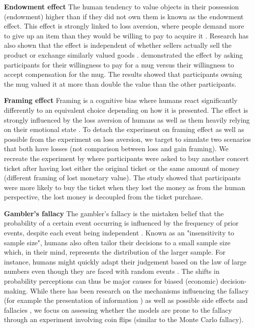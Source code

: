 \par \textbf{Endowment effect} The human tendency to value objects in their possession (endowment) higher than if they did not own them is known as the endowment effect. This effect is strongly linked to loss aversion, where people demand more to give up an item than they would be willing to pay to acquire it \parencite{kahneman1990experimental}. Research has also shown that the effect is independent of whether sellers actually sell the product or exchange similarly valued goods \parencite{knetsch1989endowment}. \textcite{kahneman1990experimental} demonstrated the effect by asking participants for their willingness to pay for a mug versus their willingness to accept compensation for the mug. The results showed that participants owning the mug valued it at more than double the value than the other participants.

\par \textbf{Framing effect} Framing is a cognitive bias where humans react significantly differently to an equivalent choice depending on how it is presented. The effect is strongly influenced by the loss aversion of humans as well as them heavily relying on their emotional state \parencite{tversky1981framing}. To detach the experiment on framing effect as well as possible from the experiment on loss aversion, we target to simulate two scenarios that both have losses (not comparison between loss and gain framing). We recreate the experiment by \textcite{tversky1981framing} where participants were asked to buy another concert ticket after having lost either the original ticket or the same amount of money (different framing of lost monetary value). The study showed that participants were more likely to buy the ticket when they lost the money as from the human perspective, the lost money is decoupled from the ticket purchase.

\par \textbf{Gambler's fallacy} The gambler's fallacy is the mistaken belief that the probability of a certain event occurring is influenced by the frequency of prior events, despite each event being independent \parencite{bar1991perception,kovic2019gambler}. Known as an "insensitivity to sample size", humans also often tailor their decisions to a small sample size which, in their mind, represents the distribution of the larger sample. For instance, humans might quickly adapt their judgement based on the law of large numbers even though they are faced with random events \parencite{tversky1974judgment}. The shifts in probability perceptions can thus be major causes for biased (economic) decision-making. While there has been research on the mechanisms influencing the fallacy (for example the presentation of information \parencite{barron2010role}) as well as possible side effects and fallacies \parencite{kovic2019gambler}, we focus on assessing whether the models are prone to the fallacy through an experiment involving coin flips (similar to the Monte Carlo fallacy).

